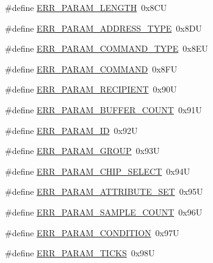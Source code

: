 \begin{DoxyCompactItemize}
\item 
\#define \hyperlink{group___p_e___error__module_ga14b3e7ce45de757b62ed57b6943e2172}{E\-R\-R\-\_\-\-P\-A\-R\-A\-M\-\_\-\-L\-E\-N\-G\-T\-H}~0x8\-C\-U
\item 
\#define \hyperlink{group___p_e___error__module_ga1c4b94765db3ec158123c398ed5da5b8}{E\-R\-R\-\_\-\-P\-A\-R\-A\-M\-\_\-\-A\-D\-D\-R\-E\-S\-S\-\_\-\-T\-Y\-P\-E}~0x8\-D\-U
\item 
\#define \hyperlink{group___p_e___error__module_gaa4b11a6a865c37326c099bc4f1d78b76}{E\-R\-R\-\_\-\-P\-A\-R\-A\-M\-\_\-\-C\-O\-M\-M\-A\-N\-D\-\_\-\-T\-Y\-P\-E}~0x8\-E\-U
\item 
\#define \hyperlink{group___p_e___error__module_gacedd3065faf570636ea5fb7774692682}{E\-R\-R\-\_\-\-P\-A\-R\-A\-M\-\_\-\-C\-O\-M\-M\-A\-N\-D}~0x8\-F\-U
\item 
\#define \hyperlink{group___p_e___error__module_gaead210c48411ddaef2b924a793ca2486}{E\-R\-R\-\_\-\-P\-A\-R\-A\-M\-\_\-\-R\-E\-C\-I\-P\-I\-E\-N\-T}~0x90\-U
\item 
\#define \hyperlink{group___p_e___error__module_gaa070f4244e26b8960766fab29f297fb8}{E\-R\-R\-\_\-\-P\-A\-R\-A\-M\-\_\-\-B\-U\-F\-F\-E\-R\-\_\-\-C\-O\-U\-N\-T}~0x91\-U
\item 
\#define \hyperlink{group___p_e___error__module_gae92766dcfa23207f4a9f6f5c9ee44b9c}{E\-R\-R\-\_\-\-P\-A\-R\-A\-M\-\_\-\-I\-D}~0x92\-U
\item 
\#define \hyperlink{group___p_e___error__module_ga01376cfa1506fab58b0ee14cb2a66285}{E\-R\-R\-\_\-\-P\-A\-R\-A\-M\-\_\-\-G\-R\-O\-U\-P}~0x93\-U
\item 
\#define \hyperlink{group___p_e___error__module_ga8c4e33d53312b200230a2640a8fdd524}{E\-R\-R\-\_\-\-P\-A\-R\-A\-M\-\_\-\-C\-H\-I\-P\-\_\-\-S\-E\-L\-E\-C\-T}~0x94\-U
\item 
\#define \hyperlink{group___p_e___error__module_ga23cb0d6ae40cae77d576f567521bd992}{E\-R\-R\-\_\-\-P\-A\-R\-A\-M\-\_\-\-A\-T\-T\-R\-I\-B\-U\-T\-E\-\_\-\-S\-E\-T}~0x95\-U
\item 
\#define \hyperlink{group___p_e___error__module_ga1285a1de60cce467f4d79bc73cd68af7}{E\-R\-R\-\_\-\-P\-A\-R\-A\-M\-\_\-\-S\-A\-M\-P\-L\-E\-\_\-\-C\-O\-U\-N\-T}~0x96\-U
\item 
\#define \hyperlink{group___p_e___error__module_gac616d07a0eba03bad3f1a78e11df56bf}{E\-R\-R\-\_\-\-P\-A\-R\-A\-M\-\_\-\-C\-O\-N\-D\-I\-T\-I\-O\-N}~0x97\-U
\item 
\#define \hyperlink{group___p_e___error__module_gafd38dd8d28af4d134dc8af4cadc4a59f}{E\-R\-R\-\_\-\-P\-A\-R\-A\-M\-\_\-\-T\-I\-C\-K\-S}~0x98\-U
\end{DoxyCompactItemize}


